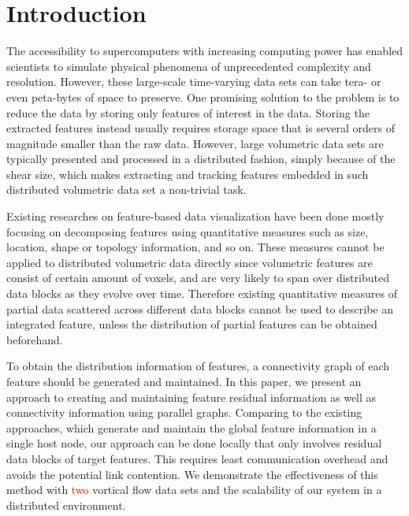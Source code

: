 \documentclass[10pt, conference, compsocconf]{IEEEtran}
\begin{document}
\section{Introduction}

The accessibility to supercomputers with increasing computing power has enabled scientists to simulate physical phenomena of unprecedented complexity and resolution. However, these large-scale time-varying data sets can take tera- or even peta-bytes of space to preserve. One promising solution to the problem is to reduce the data by storing only features of interest in the data. Storing the extracted features instead usually requires storage space that is several orders of magnitude smaller than the raw data. However, large volumetric data sets are typically presented and processed in a distributed fashion, simply because of the shear size, which makes extracting and tracking features embedded in such distributed volumetric data set a non-trivial task. 

Existing researches on feature-based data visualization have been done mostly focusing on decomposing features using quantitative measures such as size, location, shape or topology information, and so on. These measures cannot be applied to distributed volumetric data directly since volumetric features are consist of certain amount of voxels, and are very likely to span over distributed data blocks as they evolve over time. Therefore existing quantitative measures of partial data scattered across different data blocks cannot be used to describe an integrated feature, unless the distribution of partial features can be obtained beforehand.

To obtain the distribution information of features, a connectivity graph of each feature should be generated and maintained. In this paper, we present an approach to creating and maintaining feature residual information as well as connectivity information using parallel graphs. Comparing to the existing approaches, which generate and maintain the global feature information in a single host node, our approach can be done locally that only involves residual data blocks of target features. This requires least communication overhead and avoids the potential link contention. We demonstrate the effectiveness of this method with \textcolor{red}{two} vortical flow data sets and the scalability of our system in a distributed environment.
\end{document}
